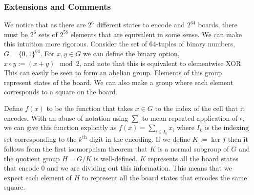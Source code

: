 \subsubsection{Extensions and Comments}

We notice that as there are $2^6$ different states to encode and $2^{64}$ boards, there must be $2^6$ sets of $2^{58}$ elements that are equivalent in some sense. We can make this intuition more rigorous. Consider the set of 64-tuples of binary numbers, $G = \{ 0, 1 \}^{64}$. For $x, y \in G$ we can define the binary option, $x \circ y := (x + y) \mod 2$, and note that this is equivalent to elementwise XOR. This can easily be seen to form an abelian group. Elements of this group represent states of the board. We can also make a group where each element corresponds to a square on the board.

Define $f(x)$ to be the function that takes $x \in G$ to the index of the cell that it encodes. With an abuse of notation using $\sum$ to mean repeated application of $\circ$, we can give this function explicitly as {$f(x) = \sum_{i \in I_k} x_i$} where $I_k$ is the indexing set corresponding to the $k^\text{th}$ digit in the encoding. If we define $K := \ker{f}$ then it follows from the first isomorphism theorem that $K$ is a normal subgroup of $G$ and the quotient group $H = G / K$ is well-defined. $K$ represents all the board states that encode $0$ and we are dividing out this information. This means that we expect each element of $H$ to represent all the board states that encodes the same square.

